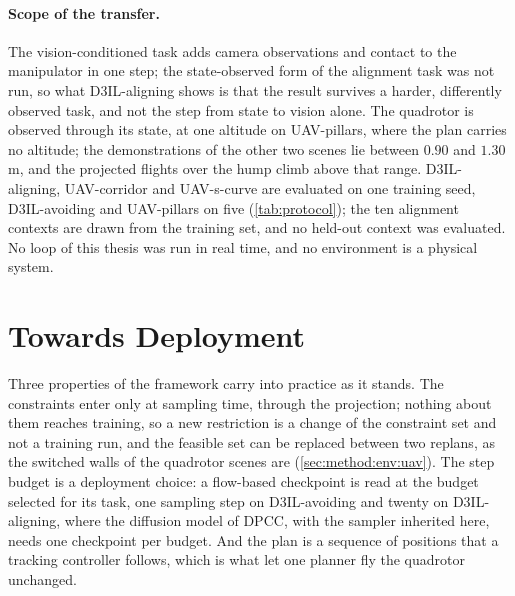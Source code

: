 \paragraph{Scope of the transfer.} The vision-conditioned task adds camera observations and contact to
the manipulator in one step; the state-observed form of the alignment task was not run, so what
D3IL-aligning shows is that the result survives a harder, differently observed task, and not the step
from state to vision alone. The quadrotor is observed through its state, at one altitude on UAV-pillars,
where the plan carries no altitude; the demonstrations of the other two scenes lie between $0.90$ and
$1.30$\,m, and the projected flights over the hump climb above that range.
D3IL-aligning, UAV-corridor and UAV-s-curve are evaluated on one training seed, D3IL-avoiding and
UAV-pillars on five (\autoref{tab:protocol}); the ten alignment contexts are drawn from the training set, and no
held-out context was evaluated. No loop of this thesis was run in real time, and no environment is a physical system.

\section{Towards Deployment}\label{sec:disc:practice}

Three properties of the framework carry into practice as it stands. The constraints enter only at
sampling time, through the projection; nothing about them reaches training, so a new restriction is a
change of the constraint set and not a training run, and the feasible set can be replaced between two
replans, as the switched walls of the quadrotor scenes are (\autoref{sec:method:env:uav}). The step
budget is a deployment choice: a flow-based checkpoint is read at the budget selected for its task,
one sampling step on D3IL-avoiding and twenty on D3IL-aligning, where the diffusion model of
\ac{DPCC}, with the sampler inherited here, needs one checkpoint per budget.
And the plan is a sequence of positions that a tracking controller follows, which is what let one
planner fly the quadrotor unchanged.

